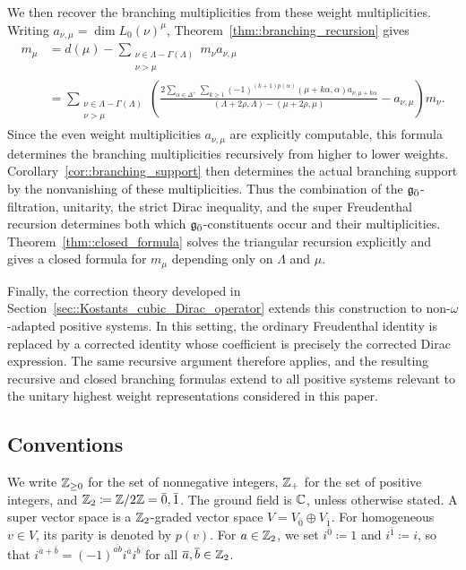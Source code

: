 We then recover the branching multiplicities from these weight multiplicities. Writing
$a_{\nu,\mu}=\dim L_0(\nu)^\mu$, Theorem~\ref{thm::branching_recursion} gives
\begin{equation}
\begin{aligned}
m_\mu
&=
d(\mu)
-
\sum_{\substack{\nu\in\Lambda-\Gamma(\Lambda)\\ \nu>\mu}}
m_\nu a_{\nu,\mu}
\\
&=
\sum_{\substack{\nu\in\Lambda-\Gamma(\Lambda)\\ \nu>\mu}}
\left(
\frac{
2\displaystyle\sum_{\alpha\in\Delta^+}\sum_{k\geq1}
(-1)^{(k+1)p(\alpha)}
(\mu+k\alpha,\alpha)
a_{\nu,\mu+k\alpha}
}{
(\Lambda+2\rho,\Lambda)-(\mu+2\rho,\mu)
}
-a_{\nu,\mu}
\right)m_\nu .
\end{aligned}
\end{equation}
Since the even weight multiplicities $a_{\nu,\mu}$ are explicitly computable, this formula determines the branching multiplicities recursively from higher to lower weights. Corollary~\ref{cor::branching_support} then determines the actual branching support by the nonvanishing of these multiplicities. Thus the combination of the ${\mathfrak{g}_{\bar{0}}}$-filtration, unitarity, the strict Dirac inequality, and the super Freudenthal recursion determines both which ${\mathfrak{g}_{\bar{0}}}$-constituents occur and their multiplicities. Theorem~\ref{thm::closed_formula} solves the triangular recursion explicitly and gives a closed formula for $m_{\mu}$ depending only on $\Lambda$ and $\mu$.

Finally, the correction theory developed in Section~\ref{sec::Kostants_cubic_Dirac_operator} extends this construction to non-$\omega$-adapted positive systems. In this setting, the ordinary Freudenthal identity is replaced by a corrected identity whose coefficient is precisely the corrected Dirac expression. The same recursive argument therefore applies, and the resulting recursive and closed branching formulas extend to all positive systems relevant to the unitary highest weight representations considered in this paper.

\subsection{Conventions}
We write ${\mathbb Z}_{\geq0}$ for the set of nonnegative integers, ${\mathbb Z}_{+}$ for the set of positive integers, and ${\mathbb Z}_{2}\coloneqq{\mathbb Z}/2{\mathbb Z}={\bar0,\bar1}$. The ground field is ${\mathbb C} $, unless otherwise stated. A super vector space is a ${\mathbb Z}_{2}$-graded vector space $V=V_{\bar0}\oplus V_{\bar1}$. For homogeneous $v\in V$, its parity is denoted by $p(v)$. For $a\in{\mathbb Z}_{2}$, we set $i^{\bar0}\coloneqq1$ and $i^{\bar1}\coloneqq i$, so that $i^{\overline{a}+\overline{b}}=(-1)^{\overline{ab}}i^{\overline{a}}i^{\overline{b}}$ for all $\overline{a},\overline{b}\in {\mathbb Z}_{2}$. 

